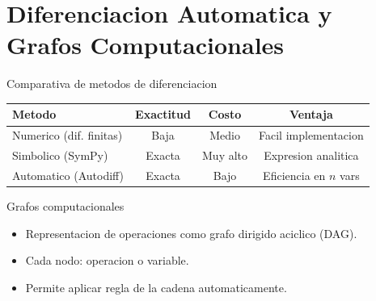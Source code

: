 \documentclass[aspectratio=169, 10pt, xcolor=table]{beamer}
\begin{document}
\section{Diferenciacion Automatica y Grafos Computacionales}

\begin{frame}{Comparativa de metodos de diferenciacion}
    \begin{table}
        \centering
        \begin{tabular}{l|c|c|c}
            \toprule
            Metodo & Exactitud & Costo & Ventaja \\
            \midrule
            Numerico (dif. finitas) & Baja & Medio & Facil implementacion \\
            Simbolico (SymPy) & Exacta & Muy alto & Expresion analitica \\
            Automatico (Autodiff) & Exacta & Bajo & Eficiencia en $n$ vars \\
            \bottomrule
        \end{tabular}
    \end{table}
\end{frame}

\begin{frame}{Grafos computacionales}
    \begin{itemize}
        \item Representacion de operaciones como grafo dirigido aciclico (DAG).
        \item Cada nodo: operacion o variable.
        \item Permite aplicar regla de la cadena automaticamente.
    \end{itemize}
    \centering
\end{frame}
\end{document}
